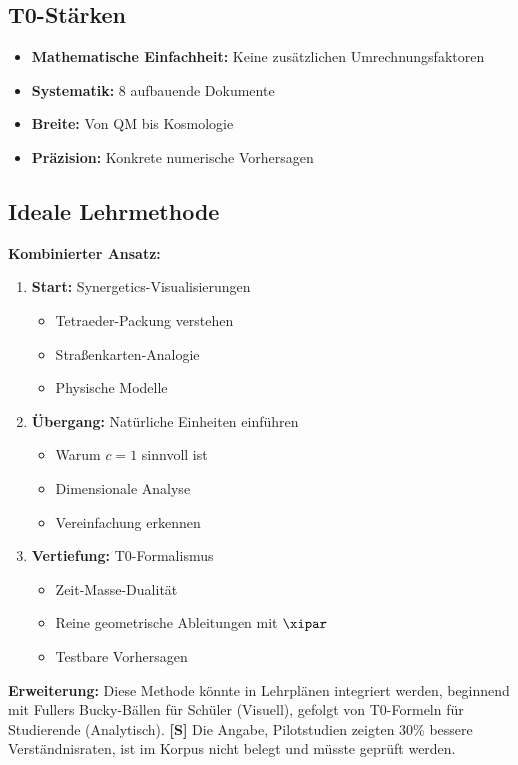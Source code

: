 	\subsection{T0-Stärken}
	
	\begin{itemize}
		\item \textbf{Mathematische Einfachheit:} Keine zusätzlichen Umrechnungsfaktoren
		\item \textbf{Systematik:} 8 aufbauende Dokumente
		\item \textbf{Breite:} Von QM bis Kosmologie
		\item \textbf{Präzision:} Konkrete numerische Vorhersagen
	\end{itemize}
	
	\subsection{Ideale Lehrmethode}
	
	\begin{gemeinsam}
		\textbf{Kombinierter Ansatz:}
		
		\begin{enumerate}
			\item \textbf{Start:} Synergetics-Visualisierungen
			\begin{itemize}
				\item Tetraeder-Packung verstehen
				\item Straßenkarten-Analogie
				\item Physische Modelle
			\end{itemize}
			
			\item \textbf{Übergang:} Natürliche Einheiten einführen
			\begin{itemize}
				\item Warum $c = 1$ sinnvoll ist
				\item Dimensionale Analyse
				\item Vereinfachung erkennen
			\end{itemize}
			
			\item \textbf{Vertiefung:} T0-Formalismus
			\begin{itemize}
				\item Zeit-Masse-Dualität
				\item Reine geometrische Ableitungen mit $\xipar$
				\item Testbare Vorhersagen
			\end{itemize}
		\end{enumerate}
		
		\textbf{Erweiterung:} Diese Methode könnte in Lehrplänen integriert werden, beginnend mit Fullers Bucky-Bällen für Schüler (Visuell), gefolgt von T0-Formeln für Studierende (Analytisch). \textbf{[S]} Die Angabe, Pilotstudien zeigten 30\% bessere Verständnisraten, ist im Korpus nicht belegt und müsste geprüft werden.
	\end{gemeinsam}
	
